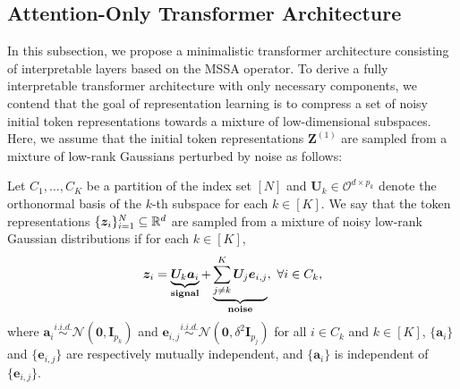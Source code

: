\documentclass[\toplevelprefix/book-main.tex]{subfiles}
\begin{document}




\subsection{Attention-Only Transformer Architecture} \label{sub:aot}

In this subsection, we propose a minimalistic transformer architecture consisting of interpretable layers based on the MSSA operator. To derive a fully interpretable transformer architecture with only necessary components,
we contend that the goal of representation learning is to compress a set of noisy initial token representations towards a mixture of low-dimensional subspaces. %
Here, we assume that the initial token representations $\bm Z^{(1)}$ are sampled from a mixture of low-rank Gaussians perturbed by noise as follows: 
\begin{definition}\label{def:MoG}
Let $C_1,\dots,C_K$ be a partition of the index set $[N]$ and $\bm U_k \in \mathcal{O}^{d \times p_k}$ denote the orthonormal basis of the $k$-th subspace for each $k \in [K]$. We say that the token representations $\{\bm z_i \}_{i=1}^N \subseteq \mathbb{R}^d$ are sampled from a mixture of noisy low-rank Gaussian distributions if for each $k \in [K]$,
\begin{align}\label{eq:MoG}
    \bm z_i = \underbrace{\bm U_{k} \bm a_i}_{\bf signal} + \underbrace{\sum_{j \neq k}^K \bm U_j \bm e_{i,j}}_{\bf noise},\ \forall i \in C_k, 
\end{align}
where $\bm{a}_i \overset{i.i.d.}{\sim} \mathcal{N}(\bm{0},\bm{I}_{p_k})$ and $\bm{e}_{i,j} \overset{i.i.d.}{\sim} \mathcal{N}(\bm{0},\delta^2\bm{I}_{p_j})$ for all $i \in C_k$ and $k \in [K]$, $\{\bm{a}_i\}$ and $\{\bm{e}_{i,j}\}$ are respectively mutually independent, and $\{\bm{a}_i\}$ is independent of $\{\bm{e}_{i,j}\}$.         
\end{definition}
\end{document}

